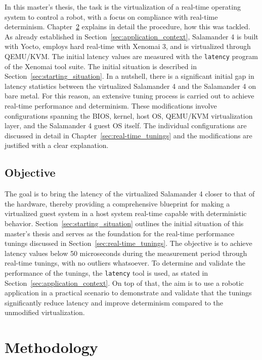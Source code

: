 \documentclass[MMR,Master,english]{style/twbook}
\begin{document}
\clearpage

\bigskip \noindent In this master's thesis, the task is the virtualization of a real-time operating system to control a robot, with a focus on compliance with real-time determinism. Chapter~\ref{cha:methodology} explains in detail the procedure, how this was tackled. As already established in Section~\ref{sec:application_context}, Salamander 4 is built with Yocto, employs hard real-time with Xenomai 3, and is virtualized through QEMU/KVM. The initial latency values are measured with the \texttt{latency} program of the Xenomai tool suite. The initial situation is described in Section~\ref{sec:starting_situation}. In a nutshell, there is a significant initial gap in latency statistics between the virtualized Salamander 4 and the Salamander 4 on bare metal. For this reason, an extensive tuning process is carried out to achieve real-time performance and determinism. These modifications involve configurations spanning the BIOS, kernel, host OS, QEMU/KVM virtualization layer, and the Salamander 4 guest OS itself. The individual configurations are discussed in detail in Chapter~\ref{sec:real-time_tunings} and the modifications are justified with a clear explanation.

\section{Objective}
The goal is to bring the latency of the virtualized Salamander 4 closer to that of the hardware, thereby providing a comprehensive blueprint for making a virtualized guest system in a host system real-time capable with deterministic behavior. Section~\ref{sec:starting_situation} outlines the initial situation of this master's thesis and serves as the foundation for the real-time performance tunings discussed in Section~\ref{sec:real-time_tunings}. The objective is to achieve latency values below 50 microseconds during the measurement period through real-time tunings, with no outliers whatsoever. To determine and validate the performance of the tunings, the \texttt{latency} tool is used, as stated in Section~\ref{sec:application_context}. On top of that, the aim is to use a robotic application in a practical scenario to demonstrate and validate that the tunings significantly reduce latency and improve determinism compared to the unmodified virtualization.

\clearpage

\chapter{Methodology}\label{cha:methodology}
\end{document}

